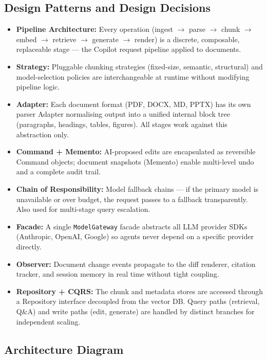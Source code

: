 \documentclass[10pt]{article}
\begin{document}
\subsection{Design Patterns and Design Decisions}
\begin{itemize}
  \item \textbf{Pipeline Architecture:} Every operation (ingest $\to$ parse $\to$ chunk $\to$ embed $\to$ retrieve $\to$ generate $\to$ render) is a discrete, composable, replaceable stage --- the Copilot request pipeline applied to documents.
  \item \textbf{Strategy:} Pluggable chunking strategies (fixed-size, semantic, structural) and model-selection policies are interchangeable at runtime without modifying pipeline logic.
  \item \textbf{Adapter:} Each document format (PDF, DOCX, MD, PPTX) has its own parser Adapter normalising output into a unified internal block tree (paragraphs, headings, tables, figures). All stages work against this abstraction only.
  \item \textbf{Command + Memento:} AI-proposed edits are encapsulated as reversible Command objects; document snapshots (Memento) enable multi-level undo and a complete audit trail.
  \item \textbf{Chain of Responsibility:} Model fallback chains --- if the primary model is unavailable or over budget, the request passes to a fallback transparently. Also used for multi-stage query escalation.
  \item \textbf{Facade:} A single \texttt{ModelGateway} facade abstracts all LLM provider SDKs (Anthropic, OpenAI, Google) so agents never depend on a specific provider directly.
  \item \textbf{Observer:} Document change events propagate to the diff renderer, citation tracker, and session memory in real time without tight coupling.
  \item \textbf{Repository + CQRS:} The chunk and metadata stores are accessed through a Repository interface decoupled from the vector DB. Query paths (retrieval, Q\&A) and write paths (edit, generate) are handled by distinct branches for independent scaling.
\end{itemize}

\subsection{Architecture Diagram}
\end{document}

